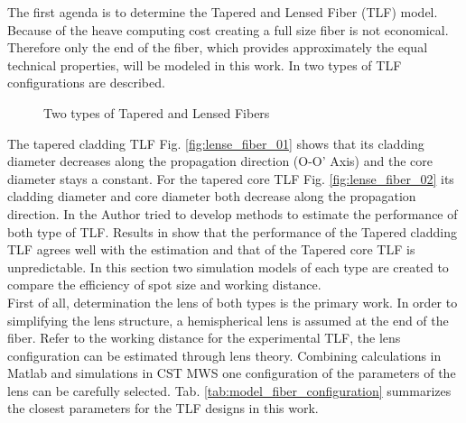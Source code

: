 
The first agenda is to determine the Tapered and Lensed Fiber (TLF) model. Because of the heave computing cost creating a full size fiber is not economical. Therefore only the end of the fiber, which provides approximately the equal technical properties, will be modeled in this work. In \cite{TLF_analysis,TLF_mode_transforming} two types of TLF configurations are described.\\ 

\begin{figure}[!ht]
\centering
{}
\hfill
{}
\label{fig:two_TLF}
\caption{Two types of Tapered and Lensed Fibers}
\end{figure}
The tapered cladding TLF Fig. \ref{fig:lense_fiber_01} shows that its cladding diameter decreases along the propagation direction (O-O' Axis) and the core diameter stays a constant. For the tapered core TLF Fig. \ref{fig:lense_fiber_02} its cladding diameter and core diameter both decrease along the propagation direction. In \cite{TLF_mode_transforming} the Author tried to develop methods to estimate the performance of both type of TLF. Results in \cite{TLF_mode_transforming} show that the performance of the Tapered cladding TLF agrees well with the estimation and that of the Tapered core TLF is unpredictable. In this section two simulation models of each type are created to compare the efficiency of spot size and working distance.\\  

First of all, determination the lens of both types is the primary work. In order to simplifying the lens structure, a hemispherical lens is assumed at the end of the fiber. Refer to the working distance for the experimental TLF, the lens configuration can be estimated through lens theory. Combining calculations in Matlab and simulations in CST MWS one configuration of the parameters of the lens can be carefully selected. Tab. \ref{tab:model_fiber_configuration} summarizes the closest parameters for the TLF designs in this work.\\   

